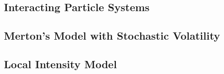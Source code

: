 \subsection{Interacting Particle Systems}

\subsection{Merton's Model with Stochastic Volatility}

\subsection{Local Intensity Model}


